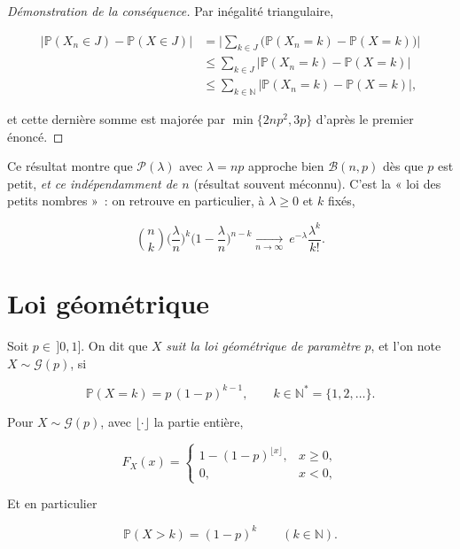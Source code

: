\begin{proof}[Démonstration de la conséquence]
Par inégalité triangulaire,

\begin{align*}
  \big|\mathbb{P}(X_n\in J)-\mathbb{P}(X\in J)\big| &=\Big|\sum_{k\in J}\big(\mathbb{P}(X_n=k)-\mathbb{P}(X=k)\big)\Big| \\
  &\le\sum_{k\in J}\big|\mathbb{P}(X_n=k)-\mathbb{P}(X=k)\big|\\
  &\le\sum_{k\in\mathbb{N}}\big|\mathbb{P}(X_n=k)-\mathbb{P}(X=k)\big|,
\end{align*}

et cette dernière somme est majorée par $\min\{2np^2,3p\}$ d'après le premier énoncé.
\end{proof}

\begin{remarque}
Ce résultat montre que $\mathcal{P}(\lambda)$ avec $\lambda=np$ approche bien $\mathcal{B}(n,p)$ dès que $p$ est petit, \emph{et ce indépendamment de $n$} (résultat souvent méconnu). C'est la « loi des petits nombres »~: on retrouve en particulier, à $\lambda\ge0$ et $k$ fixés,

$$
  \binom nk\Big(\frac\lambda n\Big)^k\Big(1-\frac\lambda n\Big)^{n-k}
  \xrightarrow[n\to\infty]{}\ e^{-\lambda}\frac{\lambda^k}{k!}.
$$
\end{remarque}

\section{Loi géométrique}

\medskip

\begin{mdframed}
\begin{definition}
Soit $p\in\,]0,1]$. On dit que $X$ \emph{suit la loi géométrique de paramètre $p$}, et l'on note $X\sim\mathcal{G}(p)$, si

$$
  \mathbb{P}(X=k)=p\,(1-p)^{k-1},\qquad k\in\mathbb{N}^*=\{1,2,\dots\}.
$$
\end{definition}
\end{mdframed}

\medskip

\begin{mdframed}
\begin{proposition}
Pour $X\sim\mathcal{G}(p)$, avec $\lfloor\cdot\rfloor$ la partie entière,

$$
  F_X(x)=
  \begin{cases}
    1-(1-p)^{\lfloor x\rfloor}, & x\ge 0,\\[2pt]
    0, & x<0,
  \end{cases}
$$

Et en particulier

$$
 \mathbb{P}(X>k)=(1-p)^k \qquad (k\in\mathbb{N}).
$$
\end{proposition}
\end{mdframed}

